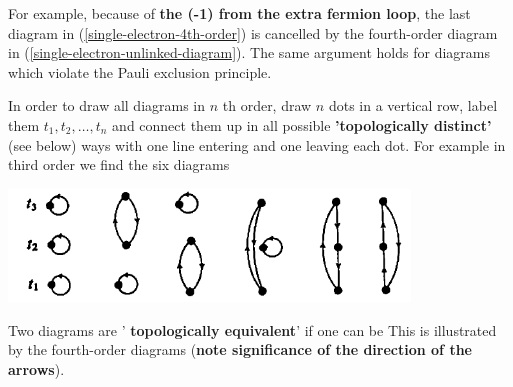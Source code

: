 For example, because of \textbf{the (-1) from the extra fermion loop}, the last diagram in (\ref{single-electron-4th-order}) is cancelled by the fourth-order diagram in (\ref{single-electron-unlinked-diagram}).  The same argument holds for diagrams which violate the Pauli exclusion principle.

In order to draw all diagrams in $n$ th order, draw $n$ dots in a vertical row, label them $t_{1}, t_{2}, \ldots, t_{n}$ and connect them up in all possible \textbf{'topologically distinct'} (see below) ways with one line entering and one leaving each dot. For example in third order we find the six diagrams
\begin{center}
    \includegraphics[width=0.8\textwidth]{screenshots/single-electron-topo-distinct.PNG}
\end{center}
Two diagrams are ' \textbf{topologically equivalent}' if one can be  This is illustrated by the fourth-order diagrams (\textbf{note significance of the direction of the arrows}).

